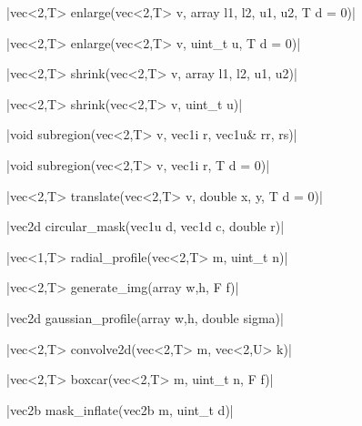 \funcitem \cppinline|vec<2,T> enlarge(vec<2,T> v, array {l1, l2, u1, u2}, T d = 0)| 

\cppinline|vec<2,T> enlarge(vec<2,T> v, uint_t u, T d = 0)|

\funcitem \cppinline|vec<2,T> shrink(vec<2,T> v, array {l1, l2, u1, u2})| 

\cppinline|vec<2,T> shrink(vec<2,T> v, uint_t u)|

\funcitem \cppinline|void subregion(vec<2,T> v, vec1i r, vec1u& rr, rs)| 

\cppinline|void subregion(vec<2,T> v, vec1i r, T d = 0)|

\funcitem \cppinline|vec<2,T> translate(vec<2,T> v, double x, y, T d = 0)| 

\funcitem \cppinline|vec2d circular_mask(vec1u d, vec1d c, double r)| 

\funcitem \cppinline|vec<1,T> radial_profile(vec<2,T> m, uint_t n)| 

\funcitem \cppinline|vec<2,T> generate_img(array {w,h}, F f)| 

\funcitem \cppinline|vec2d gaussian_profile(array {w,h}, double sigma)| 

\funcitem \cppinline|vec<2,T> convolve2d(vec<2,T> m, vec<2,U> k)| 

\funcitem \cppinline|vec<2,T> boxcar(vec<2,T> m, uint_t n, F f)| 

\funcitem \cppinline|vec2b mask_inflate(vec2b m, uint_t d)| 
